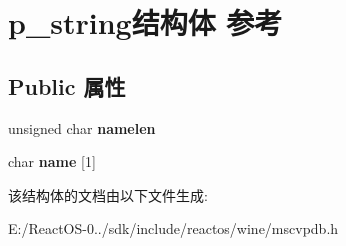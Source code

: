 \hypertarget{structp__string}{}\section{p\+\_\+string结构体 参考}
\label{structp__string}
\subsection*{Public 属性}
\begin{DoxyCompactItemize}
\item 
\mbox{\label{structp__string_ae37a38e8e0df3c7ce3b376474b4b47da}} 
unsigned char {\bfseries namelen}
\item 
\mbox{\label{structp__string_a512d5ec7216e56d87a00501d077d0e43}} 
char {\bfseries name} \mbox{[}1\mbox{]}
\end{DoxyCompactItemize}


该结构体的文档由以下文件生成\+:\begin{DoxyCompactItemize}
\item 
E\+:/\+React\+O\+S-\/0../sdk/include/reactos/wine/mscvpdb.\+h\end{DoxyCompactItemize}
